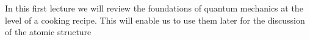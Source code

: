In this first lecture we will review the foundations of quantum mechanics at the level of a cooking recipe. This will enable us to use them later for the discussion of the atomic structure